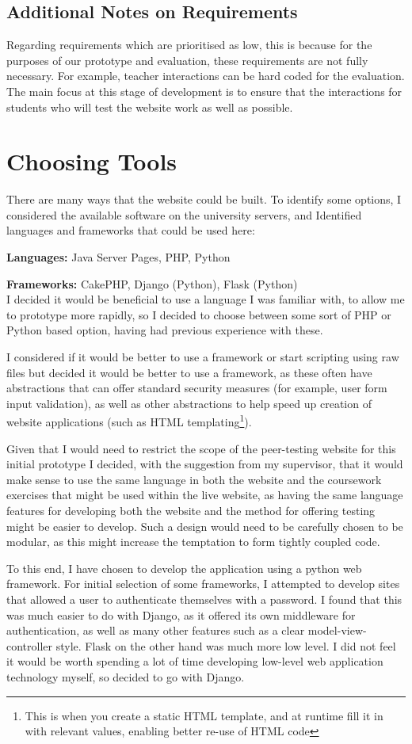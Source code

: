 \documentclass[a4paper,11pt]{report}
\begin{document}
\subsection{Additional Notes on Requirements}
Regarding requirements which are prioritised as low, this is because for the purposes of our prototype and evaluation, these requirements are not fully necessary. For example, teacher interactions can be hard coded for the evaluation. The main focus at this stage of development is to ensure that the interactions for students who will test the website work as well as possible.

\section{Choosing Tools}
There are many ways that the website could be built. To identify some options, I considered the available software on the university servers, and Identified languages and frameworks that could be used here:\par
\textbf{Languages:} Java Server Pages, PHP, Python\par
\textbf{Frameworks:} CakePHP, Django (Python), Flask (Python)\\
I decided it would be beneficial to use a language I was familiar with, to allow me to prototype more rapidly, so I decided to choose between some sort of PHP or Python based option, having had previous experience with these.\par
I considered if it would be better to use a framework or start scripting using raw files but decided it would be better to use a framework, as these often have abstractions that can offer standard security measures (for example, user form input validation), as well as other abstractions to help speed up creation of website applications (such as HTML templating\footnote{This is when you create a static HTML template, and at runtime fill it in with relevant values, enabling better re-use of HTML code}).\par
Given that I would need to restrict the scope of the peer-testing website for this initial prototype I decided, with the suggestion from my supervisor, that it would make sense to use the same language in both the website and the coursework exercises that might be used within the live website, as having the same language features for developing both the website and the method for offering testing might be easier to develop. Such a design would need to be carefully chosen to be modular, as this might increase the temptation to form tightly coupled code.\par
To this end, I have chosen to develop the application using a python web framework. For initial selection of some frameworks, I attempted to develop sites that allowed a user to authenticate themselves with a password. I found that this was much easier to do with Django, as it offered its own middleware for authentication, as well as many other features such as a clear model-view-controller style. Flask on the other hand was much more low level. I did not feel it would be worth spending a lot of time developing low-level web application technology myself, so decided to go with Django.\par
\end{document}
